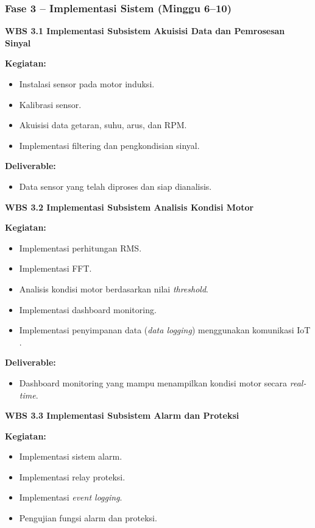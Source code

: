 \documentclass{elsinta}
\begin{document}
\subsubsection*{Fase 3 -- Implementasi Sistem (Minggu 6--10)}

\textbf{WBS 3.1 Implementasi Subsistem Akuisisi Data dan Pemrosesan Sinyal}

\textbf{Kegiatan:}
\begin{itemize}
    \item Instalasi sensor pada motor induksi.
    \item Kalibrasi sensor.
    \item Akuisisi data getaran, suhu, arus, dan RPM.
    \item Implementasi filtering dan pengkondisian sinyal.
\end{itemize}

\textbf{Deliverable:}
\begin{itemize}
    \item Data sensor yang telah diproses dan siap dianalisis.
\end{itemize}

\textbf{WBS 3.2 Implementasi Subsistem Analisis Kondisi Motor}

\textbf{Kegiatan:}
\begin{itemize}
    \item Implementasi perhitungan RMS.
    \item Implementasi FFT.
    \item Analisis kondisi motor berdasarkan nilai \textit{threshold}.
   \item Implementasi dashboard monitoring.
\item Implementasi penyimpanan data (\textit{data logging}) menggunakan komunikasi IoT \cite{bahga2014,mqtt311}.
\end{itemize}

\textbf{Deliverable:}
\begin{itemize}
    \item Dashboard monitoring yang mampu menampilkan kondisi motor secara \textit{real-time}.
\end{itemize}

\textbf{WBS 3.3 Implementasi Subsistem Alarm dan Proteksi}

\textbf{Kegiatan:}
\begin{itemize}
    \item Implementasi sistem alarm.
    \item Implementasi relay proteksi.
    \item Implementasi \textit{event logging}.
    \item Pengujian fungsi alarm dan proteksi.
\end{itemize}
\end{document}
